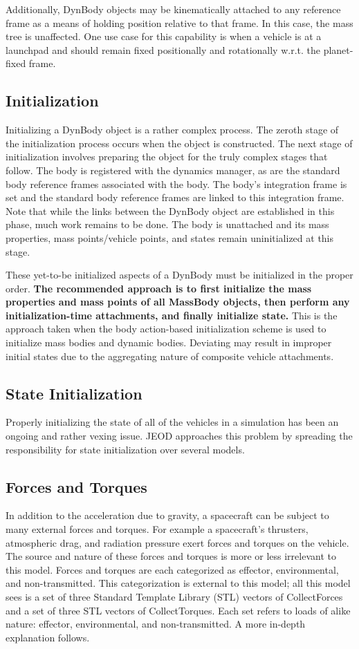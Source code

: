 Additionally, DynBody objects may be kinematically attached to any reference frame as a means of holding position 
relative to that frame. In this case, the mass tree is unaffected. One use case for this capability is when a vehicle 
is at a launchpad and should remain fixed positionally and rotationally w.r.t. the planet-fixed frame.

\subsection*{Initialization}
Initializing a DynBody object is a rather complex process. The zeroth stage
of the initialization process occurs when the object is constructed.
The next stage of initialization involves preparing the object for the truly
complex stages that follow. The body is registered with the dynamics manager,
as are the standard body reference frames associated with the body. The
body's integration frame is set and the standard body reference frames are
linked to this integration frame. Note that while the links between the
DynBody object are established in this phase, much work remains to be done.
The body is unattached and its mass properties, mass points/vehicle points, and
states remain uninitialized at this stage.

These yet-to-be initialized aspects of a DynBody must be initialized in the
proper order. \textbf{The recommended approach is to first initialize the mass
properties and mass points of all MassBody objects, then perform any
initialization-time attachments, and finally initialize state.} This is
the approach taken when the body action-based initialization scheme is used
to initialize mass bodies and dynamic bodies. Deviating may result in improper
initial states due to the aggregating nature of composite vehicle attachments.

\subsection*{State Initialization}
Properly initializing the state of all of the vehicles in a simulation
has been an ongoing and rather vexing issue. JEOD approaches this problem by
spreading the responsibility for state initialization over several models.

\subsection*{Forces and Torques}
In addition to the acceleration due to gravity,
a spacecraft can be subject to many external forces and torques.
For example a spacecraft's thrusters, atmospheric drag, and radiation pressure
exert forces and torques on the vehicle. The source and nature of these forces
and torques is more or less irrelevant to this model.
Forces and torques are each categorized as effector, environmental, and
non-transmitted. This categorization is external to this model; all this model
sees is a set of three Standard Template Library (STL) vectors of
CollectForces and a set of three STL vectors of CollectTorques. Each set refers
 to loads of alike nature: effector, environmental, and non-transmitted.
A more in-depth explanation follows.

